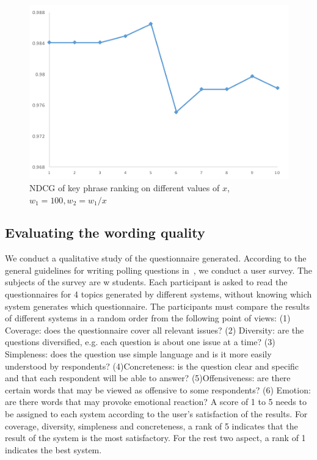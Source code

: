 \documentclass{llncs}
\begin{document}
\begin{figure}[htbp]
\begin{center}
\includegraphics[scale=0.3]{NDCG.pdf}
\caption{NDCG of key phrase ranking on different values of $x$, $w_1=100, w_2=w_1/x$}
\label{fig:performancepair}
\end{center}
\end{figure}

\subsection{Evaluating the wording quality}
We conduct a qualitative study of the questionnaire generated.  According to the general guidelines for writing polling questions in~\cite{Trochim2000Research}, we conduct a user survey. The subjects of the survey are w students. Each participant is asked to read the questionnaires for 4 topics generated by different systems, without knowing which system generates which questionnaire. The participants must compare the results of different systems in a random order from the following point of views:  (1) Coverage: does the questionnaire cover all relevant issues? (2) Diversity: are the questions diversified, e.g. each question is about one issue at a time? (3) Simpleness: does the question use simple language and is it more easily understood by respondents? (4)Concreteness: is the question clear and specific and that each respondent will be able to answer? (5)Offensiveness: are there certain words that may be viewed as offensive to some respondents? (6) Emotion: are there words that may provoke emotional reaction? A score of 1 to 5 needs to be assigned to each system according to the user's satisfaction of the results. For coverage, diversity, simpleness and concreteness, a rank of 5  indicates that the result of the system is the most satisfactory. For the rest two aspect, a rank of 1 indicates the best system. 
\end{document}
